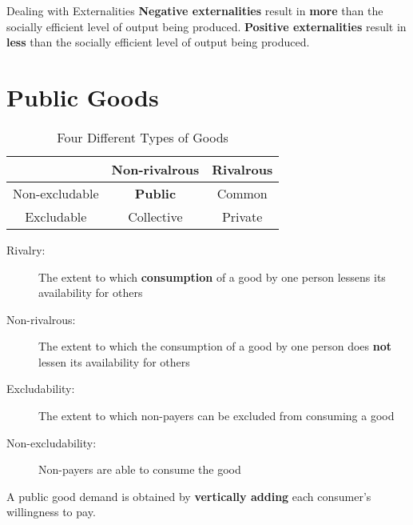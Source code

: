 \begin{note}{Dealing with Externalities}
	\textbf{Negative externalities} result in \textbf{more} than the socially efficient level of output being produced. \textbf{Positive externalities} result in \textbf{less} than the socially efficient level of output being produced.
\end{note}

\section{Public Goods}
\begin{table}[H]
	\centering
	\begin{tabular}{c|cc}
		& Non-rivalrous & Rivalrous\\\hline
		Non-excludable & \textbf{Public} & Common\\
		Excludable & Collective & Private
	\end{tabular}
	\caption{Four Different Types of Goods}
\end{table}
\begin{description}
	\item[Rivalry:] The extent to which \textbf{consumption} of a good by one person lessens its availability for others
	\item[Non-rivalrous:] The extent to which the consumption of a good by one person does \textbf{not} lessen its availability for others
	\item[Excludability:] The extent to which non-payers can be excluded from consuming a good
	\item[Non-excludability:] Non-payers are able to consume the good
\end{description}
A public good demand is obtained by \textbf{vertically adding} each consumer's willingness to pay.